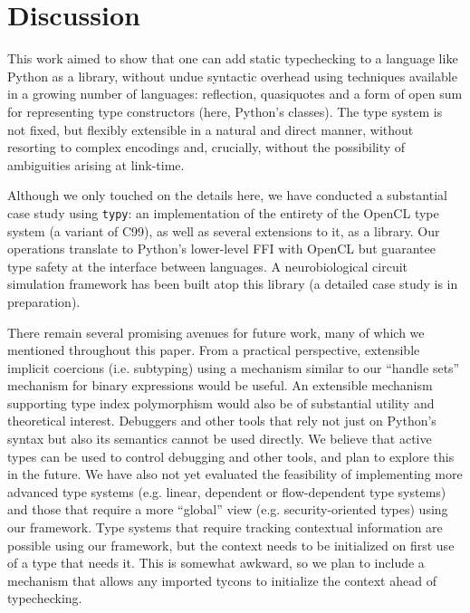 \documentclass{sigplanconf}
\begin{document}
\section{Discussion}\label{discussion}
This work aimed to show that one can add static typechecking to a language like Python as a library, without undue syntactic overhead using techniques available in a growing number of languages: reflection, quasiquotes and a form of open sum for representing type constructors (here, Python's classes). The type system is not fixed, but flexibly extensible in a natural and direct manner, without resorting to complex encodings and, crucially, without the possibility of ambiguities arising at link-time. 

Although we only touched on the details here, we have conducted a substantial case study using \texttt{typy}: an implementation of the entirety of the OpenCL type system (a variant of C99), as well as several extensions to it, as a library. Our operations translate to Python's lower-level FFI with OpenCL but guarantee type safety at the interface between languages. A neurobiological circuit simulation framework has been built atop this library (a detailed case study is in preparation). %

There remain several promising avenues for future work, many of which we mentioned throughout this paper. From a practical perspective, extensible implicit coercions (i.e. subtyping) using a mechanism similar to our ``handle sets'' mechanism for binary expressions would be useful. An extensible mechanism supporting type index polymorphism would also be of substantial utility and theoretical interest. Debuggers and other tools that rely not just on Python's syntax but also its semantics cannot be used directly. We believe that active types can be used to control debugging and other tools, and plan to explore this in the future. We have also not yet evaluated the feasibility of implementing more advanced type systems (e.g. linear, dependent or flow-dependent type systems) and those that require a more ``global'' view (e.g. security-oriented types) using our framework. Type systems that require tracking contextual information are possible using our framework, but the context needs to be initialized on first use of a type that needs it. This is somewhat awkward, so we plan to include a mechanism that allows any imported tycons to initialize the context ahead of typechecking.
\end{document}
